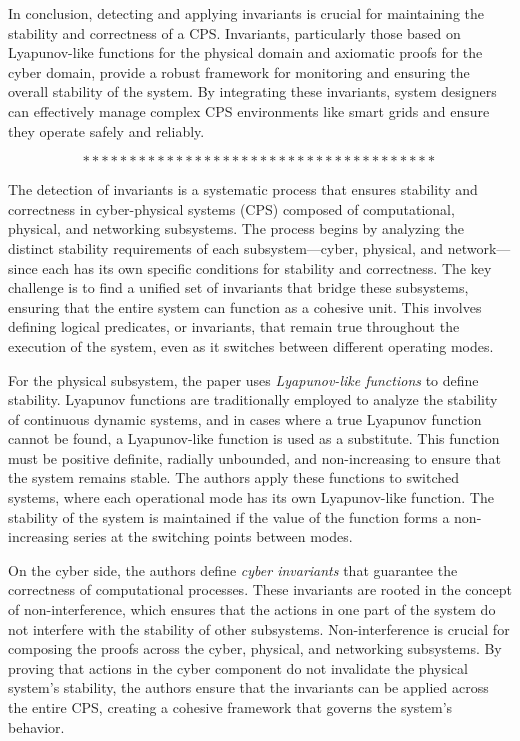 In conclusion, detecting and applying invariants is crucial for maintaining the stability and correctness of a CPS. Invariants, particularly those based on Lyapunov-like functions for the physical domain and axiomatic proofs for the cyber domain, provide a robust framework for monitoring and ensuring the overall stability of the system. By integrating these invariants, system designers can effectively manage complex CPS environments like smart grids and ensure they operate safely and reliably\cite{27}.


$$**************************************$$

The detection of invariants is a systematic process that ensures stability and correctness in cyber-physical systems (CPS) composed of computational, physical, and networking subsystems. The process begins by analyzing the distinct stability requirements of each subsystem—cyber, physical, and network—since each has its own specific conditions for stability and correctness. The key challenge is to find a unified set of invariants that bridge these subsystems, ensuring that the entire system can function as a cohesive unit. This involves defining logical predicates, or invariants, that remain true throughout the execution of the system, even as it switches between different operating modes.

For the physical subsystem, the paper uses \textit{Lyapunov-like functions} to define stability. Lyapunov functions are traditionally employed to analyze the stability of continuous dynamic systems, and in cases where a true Lyapunov function cannot be found, a Lyapunov-like function is used as a substitute. This function must be positive definite, radially unbounded, and non-increasing to ensure that the system remains stable. The authors apply these functions to switched systems, where each operational mode has its own Lyapunov-like function. The stability of the system is maintained if the value of the function forms a non-increasing series at the switching points between modes.

On the cyber side, the authors define \textit{cyber invariants} that guarantee the correctness of computational processes. These invariants are rooted in the concept of non-interference, which ensures that the actions in one part of the system do not interfere with the stability of other subsystems. Non-interference is crucial for composing the proofs across the cyber, physical, and networking subsystems. By proving that actions in the cyber component do not invalidate the physical system's stability, the authors ensure that the invariants can be applied across the entire CPS, creating a cohesive framework that governs the system's behavior.

